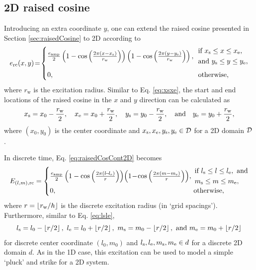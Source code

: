 \subsection{2D raised cosine}
Introducing an extra coordinate $y$, one can extend the raised cosine presented in Section \ref{sec:raisedCosine} to 2D according to 
\begin{equation}\label{eq:raisedCosCont2D}
    e_\text{rc}(x,y)\! =\! 
    \begin{cases}
        \!\frac{e_\text{amp}}{2}\left(1 - \cos\left(\frac{2\pi (x - x_\stxt)}{r_\text{w}}\right)\right)\left(1 - \cos\left(\frac{2\pi (y - y_\stxt)}{r_\text{w}}\right)\right), & 
        \!\!\!\begin{aligned}
            &\text{if } x_\stxt \leq x \leq x_\etxt, \\
            &\text{and } y_\stxt \leq y \leq y_\etxt,
        \end{aligned}\\[1.25em]
        \!0, &\!\! \text{otherwise},
    \end{cases}
\end{equation}
where $r_\text{w}$ is the excitation radius. Similar to Eq. \eqref{eq:xsxe}, the start and end locations of the raised cosine in the $x$ and $y$ direction can be calculated as
\begin{equation*}
    x_{\text{s}} = x_0 - 
    \frac{r_\text{w}}{2}, \quad x_{\text{e}} = x_0 + \frac{r_\text{w}}{2}, \quad y_{\text{s}} = y_0 - 
    \frac{r_\text{w}}{2}, \quad \text{and} \quad y_{\text{e}} = y_0 + \frac{r_\text{w}}{2},
\end{equation*}
where $(x_0, y_0)$ is the center coordinate and $x_{\text{s}}, x_{\text{e}}, y_{\text{s}},  y_\text{e}\in \mathcal{D}$ for a 2D domain $\mathcal{D}$.

In discrete time, Eq. \eqref{eq:raisedCosCont2D} becomes
\begin{equation}
    E_{(l,m), \text{rc}} = 
    \begin{cases}
        \!\frac{e_\text{amp}}{2}\left(1 - \cos\left(\frac{2\pi (l \!-\! l_\stxt)}{r}\right)\right)\!\left(1\! -\! \cos\left(\frac{2\pi (m - m_\stxt)}{r}\right)\right)\!, & \!\!\!\!
        \begin{aligned}
            &\text{if } l_\stxt \leq l \leq l_\etxt, \text{ and}\\
            & m_\stxt \leq m \leq m_\etxt,
        \end{aligned}\\
        \!0, &\!\!\!\! \text{otherwise},
    \end{cases}
\end{equation}
where $r = \floor[r_\text{w} / h]$ is the discrete excitation radius (in `grid spacings'). Furthermore, similar to Eq. \eqref{eq:lsle},
\begin{equation}
    l_\text{s} = l_0 - \floor[r/2],\ l_\etxt = l_0 + \floor[r/2],\ m_\text{s} = m_0 - \floor[r/2], \ \text{and} \ m_\etxt = m_0 + \floor[r/2]
\end{equation}
for discrete center coordinate $(l_0, m_0)$ and $l_{\text{s}}, l_{\text{e}}, m_{\text{s}},  m_\text{e}\in d$ for a discrete 2D domain $d$. 
As in the 1D case, this excitation can be used to model a simple `pluck' and strike for a 2D system. 

